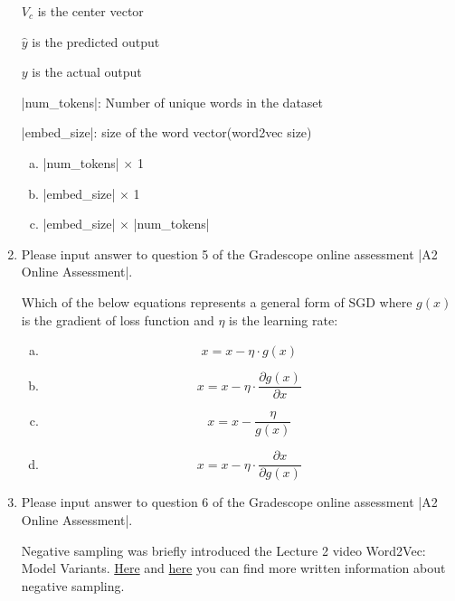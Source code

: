 \begin{enumerate}[1.]
$V_c$ is the center vector

$\hat{y}$ is the predicted output

$y$ is the actual output

|num_tokens|: Number of unique words in the dataset

|embed_size|: size of the word vector(word2vec size)

\begin{enumerate}[(a)]
\item |num_tokens| $\times$ 1
\item |embed_size| $\times$ 1
\item |embed_size| $\times$ |num_tokens|
\end{enumerate}


\item {}
Please input answer to question 5 of the Gradescope online assessment |A2 Online Assessment|.

Which of the below equations represents a general form of SGD where $g(x)$ is the gradient of loss function and $\eta$ is the learning rate:

\begin{enumerate}[(a)]
\item \begin{equation*}x = {x - \eta \cdot g(x)}\end{equation*}
\item \begin{equation*}x = {x - \eta \cdot \frac{\partial g(x)}{\partial x}}\end{equation*}
\item \begin{equation*}x = {x - \frac{\eta}{g(x)}}\end{equation*}
\item \begin{equation*}x = {x - \eta \cdot {\frac{\partial x}{\partial g(x)}}}\end{equation*}
\end{enumerate}


\item {}
Please input answer to question 6 of the Gradescope online assessment |A2 Online Assessment|.

Negative sampling was briefly introduced the Lecture 2 video Word2Vec: Model Variants. \href{https://stackoverflow.com/questions/27860652/word2vec-negative-sampling-in-layman-term#answer-27864657}{Here} and \href{https://www.quora.com/What-is-negative-sampling}{here} you can find more written information about negative sampling. 


\end{enumerate}
